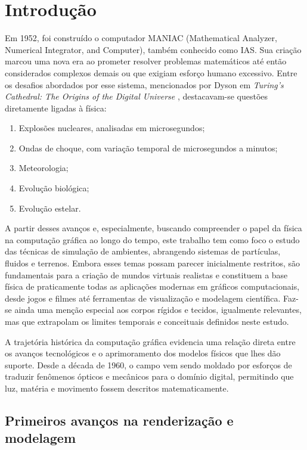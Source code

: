 \section{Introdução}

Em 1952, foi construído o computador MANIAC (Mathematical Analyzer, Numerical Integrator, and Computer), também conhecido como IAS. Sua criação marcou uma nova era ao prometer resolver problemas matemáticos até então considerados complexos demais ou que exigiam esforço humano excessivo. Entre os desafios abordados por esse sistema, mencionados por Dyson em \textit{Turing’s Cathedral: The Origins of the Digital Universe} \cite{dyson2012turing}, destacavam-se questões diretamente ligadas à física:

\begin{enumerate}
    \item Explosões nucleares, analisadas em microsegundos;
    \item Ondas de choque, com variação temporal de microsegundos a minutos;
    \item Meteorologia;
    \item Evolução biológica;
    \item Evolução estelar.
\end{enumerate}

A partir desses avanços e, especialmente, buscando compreender o papel da física na computação gráfica ao longo do tempo, este trabalho tem como foco o estudo das técnicas de simulação de ambientes, abrangendo sistemas de partículas, fluidos e terrenos. Embora esses temas possam parecer inicialmente restritos, são fundamentais para a criação de mundos virtuais realistas e constituem a base física de praticamente todas as aplicações modernas em gráficos computacionais, desde jogos e filmes até ferramentas de visualização e modelagem científica. Faz-se ainda uma menção especial aos corpos rígidos e tecidos, igualmente relevantes, mas que extrapolam os limites temporais e conceituais definidos neste estudo.

A trajetória histórica da computação gráfica evidencia uma relação direta entre os avanços tecnológicos e o aprimoramento dos modelos físicos que lhes dão suporte. Desde a década de 1960, o campo vem sendo moldado por esforços de traduzir fenômenos ópticos e mecânicos para o domínio digital, permitindo que luz, matéria e movimento fossem descritos matematicamente.

\subsection{Primeiros avanços na renderização e modelagem}

